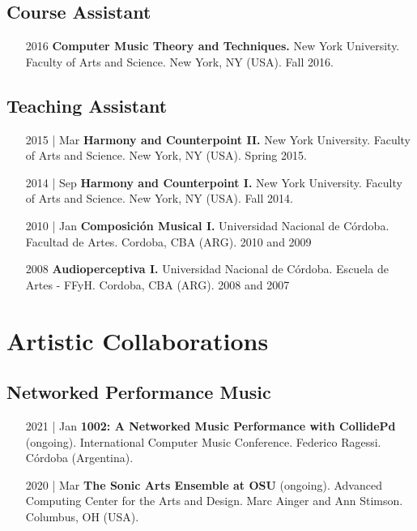 \documentclass[12pt,overlapped]{res}%
\begin{document}
\begin{resume}
\subsection{Course Assistant}%
\fullline%
\begin{itemize}[align=parleft,leftmargin=2.25cm,labelwidth=2cm]
\item[2016]
\textbf{Computer Music Theory and Techniques.}
New York University. 
Faculty of Arts and Science. 
New York, NY (USA). 
Fall 2016.
\end{itemize}%
\subsection{Teaching Assistant}%
\fullline%
\begin{itemize}[align=parleft,leftmargin=2.25cm,labelwidth=2cm]
\item[2015 | Mar]
\textbf{Harmony and Counterpoint II.}
New York University. 
Faculty of Arts and Science. 
New York, NY (USA). 
Spring 2015.
\end{itemize}%
\begin{itemize}[align=parleft,leftmargin=2.25cm,labelwidth=2cm]
\item[2014 | Sep]
\textbf{Harmony and Counterpoint I.}
New York University. 
Faculty of Arts and Science. 
New York, NY (USA). 
Fall 2014.
\end{itemize}%
\begin{itemize}[align=parleft,leftmargin=2.25cm,labelwidth=2cm]
\item[2010 | Jan]
\textbf{Composición Musical I.}
Universidad Nacional de Córdoba. 
Facultad de Artes. 
Cordoba, CBA (ARG).
2010 and 2009 
\end{itemize}
\begin{itemize}[align=parleft,leftmargin=2.25cm,labelwidth=2cm]
\item[2008]
\textbf{Audioperceptiva I.}
Universidad Nacional de Córdoba. 
Escuela de Artes {-} FFyH. 
Cordoba, CBA (ARG).
2008 and 2007 
\end{itemize}

\section{Artistic Collaborations}%
\label{sec:ArtisticCollaborations}%
\subsection{Networked Performance Music}%
\fullline%
\begin{itemize}[align=parleft,leftmargin=2.25cm,labelwidth=2cm]
\item[2021 | Jan]
\textbf{1002: A Networked Music Performance with CollidePd}
(ongoing). 
International Computer Music Conference. 
Federico Ragessi. 
Córdoba (Argentina). 
\end{itemize}%
\begin{itemize}[align=parleft,leftmargin=2.25cm,labelwidth=2cm]
\item[2020 | Mar]
\textbf{The Sonic Arts Ensemble at OSU}
(ongoing). 
Advanced Computing Center for the Arts and Design. 
Marc Ainger and Ann Stimson. 
Columbus, OH (USA). 
\end{itemize}%

\end{resume}
\end{document}
